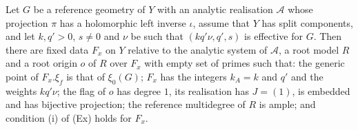 \begin{proposition}\label{pf:towergeo:refroot}
Let $G$ be a reference geometry of $Y$ with an analytic realisation $\mathcal A$ whose projection $\pi$ has a
holomorphic left inverse $\iota$, assume that $Y$ has split components, and let $k,q'>0$, $s\ne0$ and $\nu$ be such
that $(kq'\nu,q',s)$ is effective for $G$. Then there are fixed data $F_x$ on $Y$ relative to the analytic system
of $\mathcal A$, a root model $R$ and a root origin $o$ of $R$ over $F_x$ with empty set of primes such that: the
generic point of $F_x.\xi_f$ is that of $\xi_0(G)$; $F_x$ has the integers $k_A=k$ and $q'$ and the weights
$kq'\nu$; the flag of $o$ has degree $1$, its realisation has $J=(1)$, is embedded and has bijective projection;
the reference multidegree of $R$ is ample; and condition \textup{(i)} of \textup{(Ex)} holds for $F_x$.
\end{proposition}

